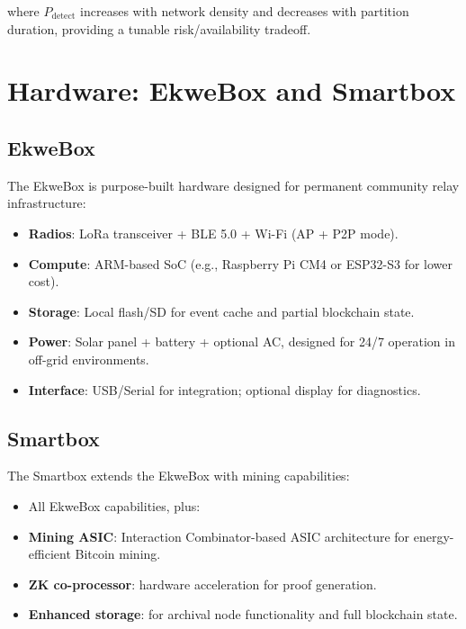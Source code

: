 \documentclass[11pt,a4paper]{article}
\begin{document}
where $P_{\text{detect}}$ increases with network density and decreases with partition duration, providing a tunable risk/availability tradeoff.

\section{Hardware: EkweBox and Smartbox}
\label{sec:hardware}

\subsection{EkweBox}

The EkweBox is purpose-built hardware designed for permanent community relay infrastructure:
\begin{itemize}[nosep]
  \item \textbf{Radios}: LoRa transceiver + BLE 5.0 + Wi-Fi (AP + P2P mode).
  \item \textbf{Compute}: ARM-based SoC (e.g., Raspberry Pi CM4 or ESP32-S3 for lower cost).
  \item \textbf{Storage}: Local flash/SD for event cache and partial blockchain state.
  \item \textbf{Power}: Solar panel + battery + optional AC, designed for 24/7 operation in off-grid environments.
  \item \textbf{Interface}: USB/Serial for integration; optional display for diagnostics.
\end{itemize}

\subsection{Smartbox}

The Smartbox extends the EkweBox with mining capabilities:
\begin{itemize}[nosep]
  \item All EkweBox capabilities, plus:
  \item \textbf{Mining ASIC}: Interaction Combinator-based ASIC architecture for energy-efficient Bitcoin mining.
  \item \textbf{ZK co-processor}: hardware acceleration for proof generation.
  \item \textbf{Enhanced storage}: for archival node functionality and full blockchain state.
\end{itemize}
\end{document}

